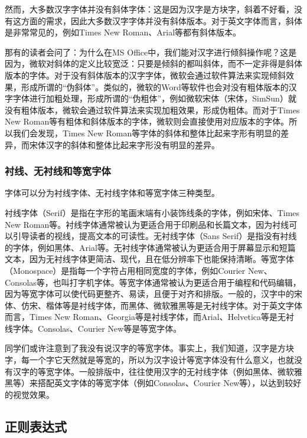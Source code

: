 然而，大多数汉字字体并没有斜体字体：这是因为汉字是方块字，斜着不好看，没有这方面的需求，因此大多数汉字字体并没有斜体版本。对于英文字体而言，斜体是非常常见的，例如Times New Roman、Arial等都有斜体版本。

那有的读者会问了：为什么在MS Office中，我们能对汉字进行倾斜操作呢？这是因为，微软对斜体的定义比较宽泛：只要是倾斜的都叫斜体，而不一定非得是斜体版本的字体。对于没有斜体版本的汉字字体，微软会通过软件算法来实现倾斜效果，形成所谓的“伪斜体”。类似的，微软的Word等软件也会对没有粗体版本的汉字字体进行加粗处理，形成所谓的“伪粗体”，例如微软宋体（宋体，SimSun）就没有粗体版本，微软会通过软件算法来实现加粗效果，形成伪粗体。而对于Times New Roman等有粗体和斜体版本的字体，微软则会直接使用对应版本的字体。所以我们会发现，Times New Roman等字体的斜体和整体比起来字形有明显的差异，而宋体汉字的斜体和整体比起来字形没有明显的差异。

\subsubsection{衬线、无衬线和等宽字体}

字体可以分为衬线字体、无衬线字体和等宽字体三种类型。

衬线字体（Serif）是指在字形的笔画末端有小装饰线条的字体，例如宋体、Times New Roman等。衬线字体通常被认为更适合用于印刷品和长篇文本，因为衬线可以引导读者的视线，提高文本的可读性。无衬线字体（Sans Serif）是指没有衬线的字体，例如黑体、Arial等。无衬线字体通常被认为更适合用于屏幕显示和短篇文本，因为无衬线字体更简洁、现代，且在低分辨率下也能保持清晰。等宽字体（Monospace）是指每一个字符占用相同宽度的字体，例如Courier New、Consolas等，也叫打字机字体。等宽字体通常被认为更适合用于编程和代码编辑，因为等宽字体可以使代码更整齐、易读，且便于对齐和排版。一般的，汉字中的宋体、仿宋、楷体等是衬线字体，而黑体、微软雅黑等是无衬线字体。对于英文字体而言，Times New Roman、Georgia等是衬线字体，而Arial、Helvetica等是无衬线字体。Consolas、Courier New等是等宽字体。

同学们或许注意到了我没有说汉字的等宽字体。事实上，我们知道，汉字是方块字，每一个字它天然就是等宽的，所以为汉字设计等宽字体没有什么意义，也就没有汉字的等宽字体。一般排版中，往往使用汉字的无衬线字体（例如黑体、微软雅黑等）来搭配英文字体的等宽字体（例如Consolas、Courier New等），以达到较好的视觉效果。

\subsection{正则表达式}\label{sec:regex}

